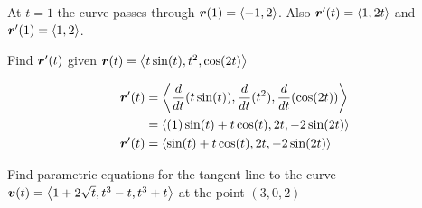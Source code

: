 \documentclass[12pt]{exam}
\begin{document}
\begin{questions}
\begin{parts}
    \ifprintanswers
        \begin{solution}
            At \(t=1\) the curve passes through \(\bm{r}(1)=\left\langle -1,2 \right\rangle\). Also \(\bm{r}'(t)=\left\langle 1,2t \right\rangle\) and \(\bm{r}'(1)=\left\langle 1,2 \right\rangle\).
        \end{solution}
    \else
        \vfill
    \fi
    \end{parts}

    \newpage

\question Find \(\bm{r}'(t)\) given \(\bm{r}(t)=\left\langle t\sin(t),t^2,\cos(2t) \right\rangle\)
    
\ifprintanswers
        \begin{solution}
            \begin{align*}
                \bm{r}'(t) & = \left\langle \frac{d}{dt}(t\sin(t)),\frac{d}{dt}(t^2),\frac{d}{dt}(\cos(2t)) \right\rangle\\
                    & = \left\langle (1)\sin(t)+t\cos(t),2t,-2\sin(2t) \right\rangle\\
                    \bm{r}'(t) & = \left\langle \sin(t)+t\cos(t),2t,-2\sin(2t) \right\rangle
            \end{align*}
        \end{solution}
    \else
        \vfill
    \fi

\question Find parametric equations for the tangent line to the curve \(\bm{v}(t)=\left\langle 1+2\sqrt{t},t^3-t,t^3+t \right\rangle\) at the point \((3,0,2)\)
    

\end{questions}
\end{document}
